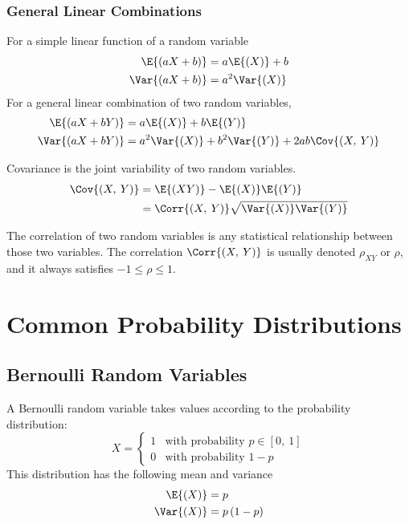 \documentclass{article}
\begin{document}
\subsubsection{General Linear Combinations}
For a simple linear function of a random variable
\begin{align*}
    \E{\left( aX + b \right)}   & = a\E{\left( X \right)} + b \\
    \Var{\left( aX + b \right)} & = a^2\Var{\left( X \right)}
\end{align*}
For a general linear combination of two random variables,
\begin{align*}
    \E{\left( aX + bY \right)}   & = a\E{\left( X \right)} + b\E{\left( Y \right)}                                           \\
    \Var{\left( aX + bY \right)} & = a^2\Var{\left( X \right)} + b^2\Var{\left( Y \right)} + 2ab \Cov{\left( X,\: Y \right)}
\end{align*}
\begin{definition}[Covariance]
    Covariance is the joint variability of two random variables.
    \begin{align*}
        \Cov{\left( X,\: Y \right)} & = \E{\left( XY \right)} - \E{\left( X \right)} \E{\left( Y \right)}                 \\
                                    & = \Corr{\left( X,\: Y \right)} \sqrt{\Var{\left( X \right)} \Var{\left( Y \right)}}
    \end{align*}
\end{definition}
\begin{definition}[Correlation]
    The correlation of two random variables is any statistical \linebreak relationship between
    those two variables. The correlation $\Corr{\left( X,\: Y \right)}$ is usually denoted $\rho_{XY}$ or $\rho$,
    and it always satisfies $-1 \leq\rho\leq 1$.
\end{definition}
\section{Common Probability Distributions}
\subsection{Bernoulli Random Variables}
A Bernoulli random variable takes values according to the probability distribution:
\begin{equation*}
    X =
    \begin{cases}
        1 & \text{with probability $p\in\left[ 0,\: 1 \right]$} \\
        0 & \text{with probability $1 - p$}
    \end{cases}
\end{equation*}
This distribution has the following mean and variance
\begin{align*}
    \E{\left( X \right)}   & = p                     \\
    \Var{\left( X \right)} & = p\left( 1 - p \right)
\end{align*}
\end{document}
